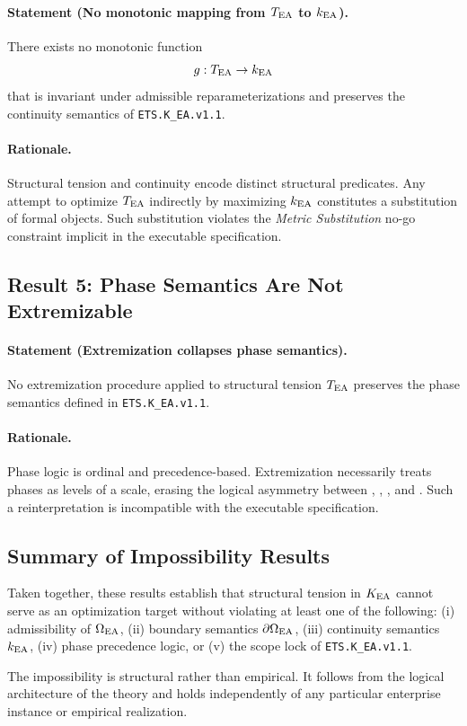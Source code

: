 \paragraph{Statement (No monotonic mapping from $T_{\mathrm{EA}}$ to $k_{\mathrm{EA}}$).}
There exists no monotonic function
\[
g : T_{\mathrm{EA}} \rightarrow k_{\mathrm{EA}}
\]
that is invariant under admissible reparameterizations and preserves the
continuity semantics of \texttt{ETS.K\_EA.v1.1}.

\paragraph{Rationale.}
Structural tension and continuity encode distinct structural predicates.
Any attempt to optimize $T_{\mathrm{EA}}$ indirectly by maximizing $k_{\mathrm{EA}}$
constitutes a substitution of formal objects. Such substitution violates
the \emph{Metric Substitution} no-go constraint implicit in the executable
specification.

\subsection{Result 5: Phase Semantics Are Not Extremizable}

\paragraph{Statement (Extremization collapses phase semantics).}
No extremization procedure applied to structural tension $T_{\mathrm{EA}}$ preserves
the phase semantics defined in \texttt{ETS.K\_EA.v1.1}.

\paragraph{Rationale.}
Phase logic is ordinal and precedence-based. Extremization necessarily
treats phases as levels of a scale, erasing the logical asymmetry between
\PHASESUCCESS, \PHASEINERTIA, \PHASECOLLAPSE, and \PHASESTOP. Such a
reinterpretation is incompatible with the executable specification.

\subsection{Summary of Impossibility Results}

Taken together, these results establish that structural tension in $K_{\mathrm{EA}}$
cannot serve as an optimization target without violating at least one of
the following:
(i) admissibility of $\Omega_{\mathrm{EA}}$,
(ii) boundary semantics $\partial\Omega_{\mathrm{EA}}$,
(iii) continuity semantics $k_{\mathrm{EA}}$,
(iv) phase precedence logic, or
(v) the scope lock of \texttt{ETS.K\_EA.v1.1}.

The impossibility is structural rather than empirical. It follows from
the logical architecture of the theory and holds independently of any
particular enterprise instance or empirical realization.

